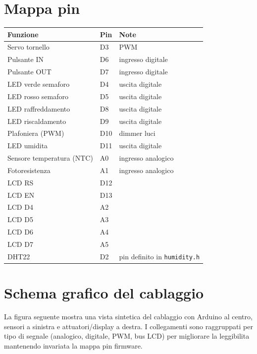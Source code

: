 \section{Mappa pin}
\begin{longtable}{@{}lll@{}}
\toprule
Funzione & Pin & Note \\
\midrule
Servo tornello & D3 & PWM \\
Pulsante IN & D6 & ingresso digitale \\
Pulsante OUT & D7 & ingresso digitale \\
LED verde semaforo & D4 & uscita digitale \\
LED rosso semaforo & D5 & uscita digitale \\
LED raffreddamento & D8 & uscita digitale \\
LED riscaldamento & D9 & uscita digitale \\
Plafoniera (PWM) & D10 & dimmer luci \\
LED umidita & D11 & uscita digitale \\
Sensore temperatura (NTC) & A0 & ingresso analogico \\
Fotoresistenza & A1 & ingresso analogico \\
LCD RS & D12 & \\
LCD EN & D13 & \\
LCD D4 & A2 & \\
LCD D5 & A3 & \\
LCD D6 & A4 & \\
LCD D7 & A5 & \\
DHT22 & D2 & pin definito in \texttt{humidity.h} \\
\bottomrule
\end{longtable}

\section{Schema grafico del cablaggio}
La figura seguente mostra una vista sintetica del cablaggio con Arduino al centro, sensori a sinistra e attuatori/display a destra. I collegamenti sono raggruppati per tipo di segnale (analogico, digitale, PWM, bus LCD) per migliorare la leggibilita mantenendo invariata la mappa pin firmware.

